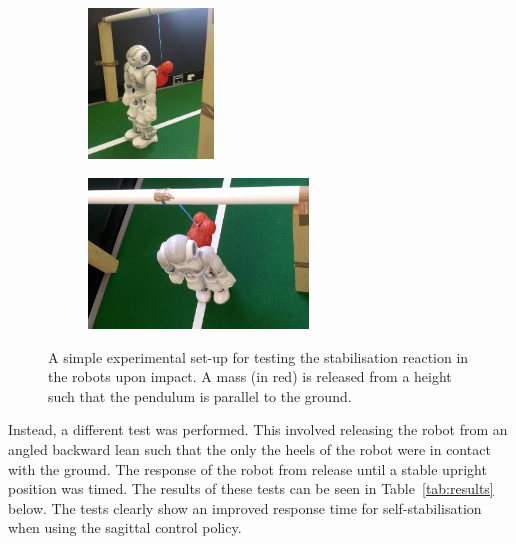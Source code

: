 \begin{figure}[h]
\centering
\begin{subfigure}{0.25\textwidth}
  \centering
  \includegraphics[height=4cm]{img/silly1.jpg}
\end{subfigure}
\begin{subfigure}{0.3\textwidth}
  \centering
  \includegraphics[height=4cm]{img/silly2.jpg}
\end{subfigure}
\caption{A simple experimental set-up for testing the stabilisation reaction in the robots upon impact. A mass (in red) is released from a height such that the pendulum is parallel to the ground.}
\label{fig:silly_experiment}
\end{figure}

Instead, a different test was performed. This involved releasing the robot from an angled backward lean such that the only the heels of the robot were in contact with the ground. The response of the robot from release until a stable upright position was timed. The results of these tests can be seen in Table~\ref{tab:results} below. The tests clearly show an improved response time for self-stabilisation when using the sagittal control policy.


